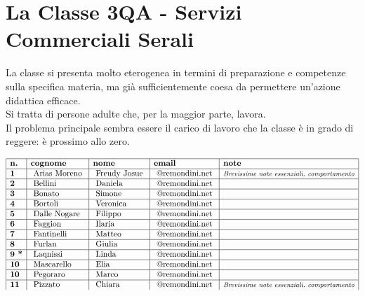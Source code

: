 \documentclass[10pt, a4paper twoside, notitlepage, notoc, justified]{tufte-handout}
\begin{document}
\newpage
\section{La Classe 3QA - Servizi Commerciali Serali}
La classe si presenta molto eterogenea in termini di preparazione e competenze sulla specifica materia, ma già sufficientemente coesa da permettere un'azione didattica efficace.\\
Si tratta di persone adulte che, per la maggior parte, lavora.\\
Il problema principale sembra essere il carico di lavoro che la classe è in grado di reggere: è prossimo allo zero.

$$
\begin{array}{|l|l|l|l|l|}
\hline \text {\bf n.} & \text {\bf cognome } & \text {\bf nome } & \text {\bf email } & \text {\bf note }\\
\hline \text {\bf 1 } & \text { Arias Moreno } & \text { Freudy Josue } & \text { @remondini.net } & \text {\emph {\footnotesize Brevissime note essenziali, comportamento}}\\
\hline \text {\bf 2 } & \text { Bellini } & \text { Daniela } & \text { @remondini.net } & \\
\hline \text {\bf 3 } & \text { Bonato } & \text { Simone } & \text { @remondini.net } & \\
\hline \text {\bf 4 } & \text { Bortoli } & \text { Veronica } & \text { @remondini.net } & \\
\hline \text {\bf 5 } & \text { Dalle Nogare } & \text { Filippo } & \text { @remondini.net } & \\
\hline \text {\bf 6 } & \text { Faggion } & \text { Ilaria } & \text { @remondini.net } & \\
\hline \text {\bf 7 } & \text { Fantinelli } & \text { Matteo } & \text { @remondini.net } & \\
\hline \text {\bf 8 } & \text { Furlan } & \text { Giulia } & \text { @remondini.net } & \\
\hline \text {\bf 9 *} & \text { Laqnissi } & \text { Linda } & \text { @remondini.net } & \\
\hline \text {\bf 10 } & \text { Mascarello } & \text { Elia } & \text { @remondini.net } & \\
\hline \text {\bf 10 } & \text { Pegoraro } & \text { Marco } & \text { @remondini.net } & \\
\hline \text {\bf 11 } & \text { Pizzato } & \text { Chiara } & \text { @remondini.net } & \text {\emph {\footnotesize Brevissime note essenziali, comportamento}}\\

\end{array}$$
\end{document}
